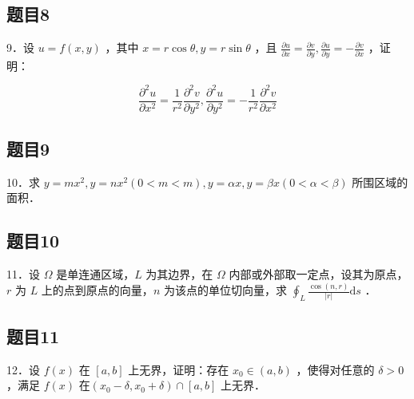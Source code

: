 \documentclass{article}
\begin{document}
\subsection{题目8}
9．设 \(u=f(x, y)\) ，其中 \(x=r \cos \theta, y=r \sin \theta\) ，且 \(\frac{\partial u}{\partial x}=\frac{\partial v}{\partial y}, \frac{\partial u}{\partial y}=-\frac{\partial v}{\partial x}\) ，证明：

\[
\frac{\partial^{2} u}{\partial x^{2}}=\frac{1}{r^{2}} \frac{\partial^{2} v}{\partial y^{2}}, \frac{\partial^{2} u}{\partial y^{2}}=-\frac{1}{r^{2}} \frac{\partial^{2} v}{\partial x^{2}}
\]

\subsection{题目9}
10．求 \(y=m x^{2}, y=n x^{2}(0<m<m), y=\alpha x, y=\beta x(0<\alpha<\beta)\) 所围区域的面积．

\subsection{题目10}
11．设 \(\Omega\) 是单连通区域，\(L\) 为其边界，在 \(\Omega\) 内部或外部取一定点，设其为原点，\(r\) 为 \(L\) 上的点到原点的向量，\(n\) 为该点的单位切向量，求 \(\oint_{L} \frac{\cos (n, r)}{|r|} \mathrm{d} s\) ．

\subsection{题目11}
12．设 \(f(x)\) 在 \([a, b]\) 上无界，证明：存在 \(x_{0} \in(a, b)\) ，使得对任意的 \(\delta>0\) ，满足 \(f(x)\) 在\(\left(x_{0}-\delta, x_{0}+\delta\right) \cap[a, b]\) 上无界．
\end{document}
